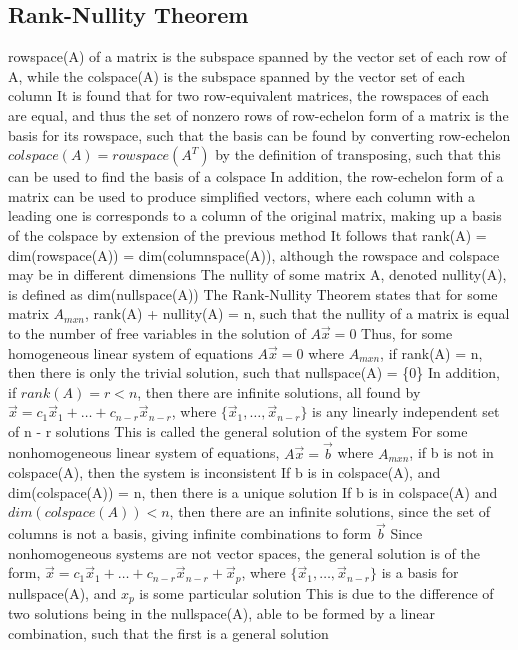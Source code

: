 \documentclass[11 pt, twoside]{article}
\newenvironment{outline*}
{
	\begin{outline}[enumerate]
	}
	{\end{outline}
}
\begin{document}
\subsection{Rank-Nullity Theorem}
\begin{outline*}
\1 rowspace(A) of a matrix is the subspace spanned by the vector set of each row of A, while the colspace(A) is the subspace spanned by the vector set of each column
\2 It is found that for two row-equivalent matrices, the rowspaces of each are equal, and thus the set of nonzero rows of row-echelon form of a matrix is the basis for its rowspace, such that the basis can be found by converting row-echelon
\2 $colspace(A) = rowspace(A^T)$ by the definition of transposing, such that this can be used to find the basis of a colspace
\3 In addition, the row-echelon form of a matrix can be used to produce simplified vectors, where each column with a leading one is corresponds to a column of the original matrix, making up a basis of the colspace by extension of the previous method
\2 It follows that rank(A) = dim(rowspace(A)) = dim(columnspace(A)), although the rowspace and colspace may be in different dimensions
\1 The nullity of some matrix A, denoted nullity(A), is defined as dim(nullspace(A))
\1 The Rank-Nullity Theorem states that for some matrix $A_{mxn}$, rank(A) + nullity(A) = n, such that the nullity of a matrix is equal to the number of free variables in the solution of $A\vec{x} = 0$
\2 Thus, for some homogeneous linear system of equations $A\vec{x} = 0$ where $A_{mxn}$, if rank(A) = n, then there is only the trivial solution, such that nullspace(A) = \{0\}
\3 In addition, if $rank(A) = r < n$, then there are infinite solutions, all found by $\vec{x} = c_1\vec{x}_1 + \dots + c_{n-r}\vec{x}_{n-r}$, where $\{\vec{x}_1, \dots, \vec{x}_{n-r}\}$ is any linearly independent set of n - r solutions
\3 This is called the general solution of the system
\2 For some nonhomogeneous linear system of equations, $A\vec{x} = \vec{b}$ where $A_{mxn}$, if b is not in colspace(A), then the system is inconsistent
\3 If b is in colspace(A), and dim(colspace(A)) = n, then there is a unique solution
\3 If b is in colspace(A) and $dim(colspace(A)) < n$, then there are an infinite solutions, since the set of columns is not a basis, giving infinite combinations to form $\vec{b}$
\3 Since nonhomogeneous systems are not vector spaces, the general solution is of the form, $\vec{x} = c_1\vec{x}_1 + \dots + c_{n-r}\vec{x}_{n-r} + \vec{x}_p$, where $\{\vec{x}_1, \dots, \vec{x}_{n-r}\}$ is a basis for nullspace(A), and $x_p$ is some particular solution
\4 This is due to the difference of two solutions being in the nullspace(A), able to be formed by a linear combination, such that the first is a general solution
\end{outline*}
\end{document}
